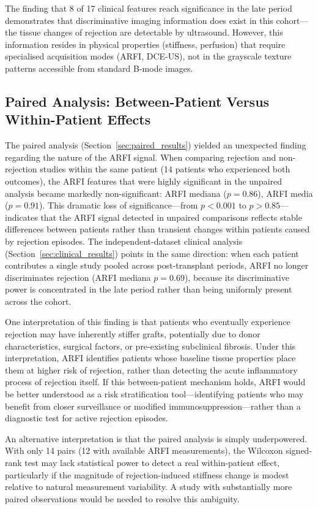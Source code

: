 The finding that 8 of 17 clinical features reach significance in the late period demonstrates that discriminative imaging information does exist in this cohort---the tissue changes of rejection are detectable by ultrasound. However, this information resides in physical properties (stiffness, perfusion) that require specialised acquisition modes (ARFI, DCE-US), not in the grayscale texture patterns accessible from standard B-mode images.

\subsection{Paired Analysis: Between-Patient Versus Within-Patient Effects}

The paired analysis (Section~\ref{sec:paired_results}) yielded an unexpected finding regarding the nature of the ARFI signal. When comparing rejection and non-rejection studies within the same patient (14 patients who experienced both outcomes), the ARFI features that were highly significant in the unpaired analysis became markedly non-significant: ARFI mediana ($p = 0.86$), ARFI media ($p = 0.91$). This dramatic loss of significance---from $p < 0.001$ to $p > 0.85$---indicates that the ARFI signal detected in unpaired comparisons reflects stable differences between patients rather than transient changes within patients caused by rejection episodes. The independent-dataset clinical analysis (Section~\ref{sec:clinical_results}) points in the same direction: when each patient contributes a single study pooled across post-transplant periods, ARFI no longer discriminates rejection (ARFI mediana $p = 0.69$), because its discriminative power is concentrated in the late period rather than being uniformly present across the cohort.

One interpretation of this finding is that patients who eventually experience rejection may have inherently stiffer grafts, potentially due to donor characteristics, surgical factors, or pre-existing subclinical fibrosis. Under this interpretation, ARFI identifies patients whose baseline tissue properties place them at higher risk of rejection, rather than detecting the acute inflammatory process of rejection itself. If this between-patient mechanism holds, ARFI would be better understood as a risk stratification tool---identifying patients who may benefit from closer surveillance or modified immunosuppression---rather than a diagnostic test for active rejection episodes.

An alternative interpretation is that the paired analysis is simply underpowered. With only 14 pairs (12 with available ARFI measurements), the Wilcoxon signed-rank test may lack statistical power to detect a real within-patient effect, particularly if the magnitude of rejection-induced stiffness change is modest relative to natural measurement variability. A study with substantially more paired observations would be needed to resolve this ambiguity.

